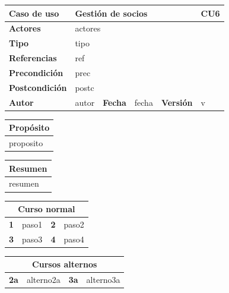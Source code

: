 \documentclass[12pt,spanish]{article}
\begin{document}
\begin{table}[H]
\centering
\begin{tabular}{|m{3cm}|m{4cm}|m{2cm}|m{2cm}|m{2cm}|m{1cm}|}
\hline
\textbf{Caso de uso} &  \multicolumn{4}{m{8cm}|}{Gestión de socios} \vline &  \cellcolor{gray!40}CU6 \\
\hline
\textbf{Actores} & \multicolumn{5}{m{8cm}|}{actores} \\
\hline
\textbf{Tipo} & \multicolumn{5}{m{8cm}|}{tipo} \\
\hline
\textbf{Referencias} &\multicolumn{5}{m{8cm}|}{ref} \\
\hline
\textbf{Precondición} & \multicolumn{5}{m{8cm}|}{prec} \\
\hline
\textbf{Postcondición} & \multicolumn{5}{m{8cm}|}{postc} \\
\hline
\textbf{Autor} & autor & \textbf{Fecha} & fecha & \textbf{Versión} & v \\
\hline
\end{tabular}

\vspace{1cm}

\begin{tabular}{|m{16.2cm}|}
\hline
\textbf{Propósito} \\
\hline
proposito \\
\hline
\end{tabular}

\vspace{1cm}

\begin{tabular}{|m{16.2cm}|}
\hline
\textbf{Resumen} \\
\hline
resumen \\
\hline
\end{tabular}

\vspace{1cm}

\begin{tabular}{|m{4pt}|m{7.33cm}|m{4pt}|m{7.33cm}|}
\hline
\multicolumn{4}{|c|}{\textbf{Curso normal}} \\
\hline
\textbf{1} & paso1 & \textbf{2} & paso2 \\
\hline
\textbf{3} & paso3 & \textbf{4} & paso4 \\
\hline
\end{tabular}

\vspace{1cm}

\begin{tabular}{|m{10pt}|m{7.15cm}|m{10pt}|m{7.15cm}|}
\hline
\multicolumn{4}{|c|}{\textbf{Cursos alternos}} \\
\hline
\textbf{2a} & alterno2a & \textbf{3a} & alterno3a  \\
\hline
\end{tabular}


\end{table}
\end{document}
